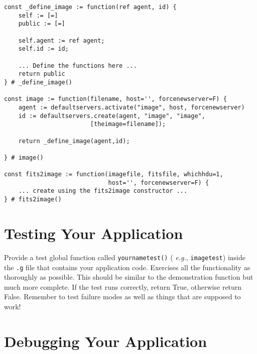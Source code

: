 \begin{verbatim}
const _define_image := function(ref agent, id) {
    self := [=]
    public := [=]

    self.agent := ref agent;
    self.id := id;

    ... Define the functions here ...
    return public
} # _define_image()

const image := function(filename, host='', forcenewserver=F) {
    agent := defaultservers.activate("image", host, forcenewserver)
    id := defaultservers.create(agent, "image", "image",
                        [theimage=filename]);

    return _define_image(agent,id);

} # image()

const fits2image := function(imagefile, fitsfile, whichhdu=1,
                             host='', forcenewserver=F) {
    ... create using the fits2image constructor ...
} # fits2image()
\end{verbatim}

\section{Testing Your Application}
\label{sec:testing}

Provide a test global function called {\tt yournametest()} ({\em
e.g.}, {\tt imagetest}) inside the {\tt .g} file that contains your
application code. Exercises all the functionality as thoroughly as
possible. This should be similar to the demonstration function but
much more complete. If the test runs correctly, return True, otherwise
return False. Remember to test failure modes as well as things that
are supposed to work!

\section{Debugging Your Application}

